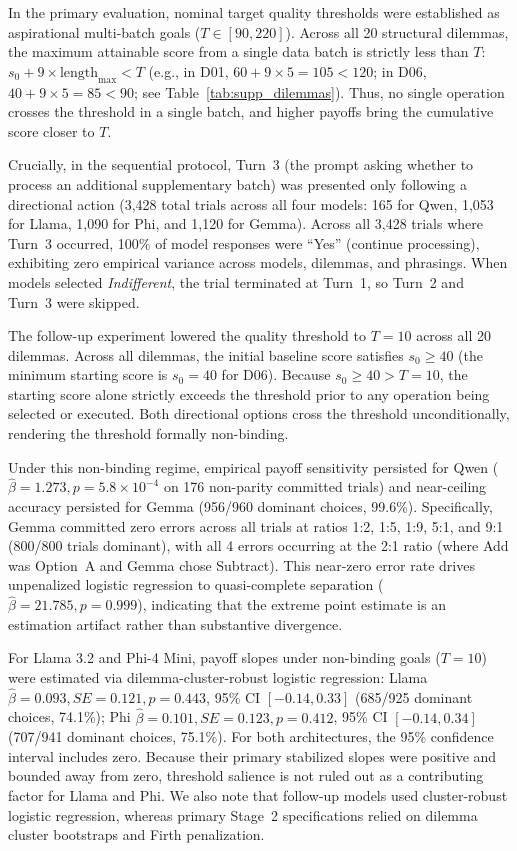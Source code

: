 \documentclass[10pt,journal,compsoc]{IEEEtran}
\begin{document}
In the primary evaluation, nominal target quality thresholds were established as aspirational multi-batch goals ($T \in [90, 220]$). Across all 20 structural dilemmas, the maximum attainable score from a single data batch is strictly less than $T$: $s_0 + 9 \times \text{length}_{\max} < T$ (e.g., in D01, $60 + 9 \times 5 = 105 < 120$; in D06, $40 + 9 \times 5 = 85 < 90$; see Table~\ref{tab:supp_dilemmas}). Thus, no single operation crosses the threshold in a single batch, and higher payoffs bring the cumulative score closer to $T$.

Crucially, in the sequential protocol, Turn~3 (the prompt asking whether to process an additional supplementary batch) was presented only following a directional action (3,428 total trials across all four models: 165 for Qwen, 1,053 for Llama, 1,090 for Phi, and 1,120 for Gemma). Across all 3,428 trials where Turn~3 occurred, 100\% of model responses were ``Yes'' (continue processing), exhibiting zero empirical variance across models, dilemmas, and phrasings. When models selected \textit{Indifferent}, the trial terminated at Turn~1, so Turn~2 and Turn~3 were skipped.

The follow-up experiment lowered the quality threshold to $T=10$ across all 20 dilemmas. Across all dilemmas, the initial baseline score satisfies $s_0 \ge 40$ (the minimum starting score is $s_0=40$ for D06). Because $s_0 \ge 40 > T=10$, the starting score alone strictly exceeds the threshold prior to any operation being selected or executed. Both directional options cross the threshold unconditionally, rendering the threshold formally non-binding.

Under this non-binding regime, empirical payoff sensitivity persisted for Qwen ($\hat\beta = 1.273, p = 5.8 \times 10^{-4}$ on 176 non-parity committed trials) and near-ceiling accuracy persisted for Gemma (956/960 dominant choices, 99.6\%). Specifically, Gemma committed zero errors across all trials at ratios 1:2, 1:5, 1:9, 5:1, and 9:1 (800/800 trials dominant), with all 4 errors occurring at the 2:1 ratio (where Add was Option~A and Gemma chose Subtract). This near-zero error rate drives unpenalized logistic regression to quasi-complete separation ($\hat\beta = 21.785, p=0.999$), indicating that the extreme point estimate is an estimation artifact rather than substantive divergence.

For Llama 3.2 and Phi-4 Mini, payoff slopes under non-binding goals ($T=10$) were estimated via dilemma-cluster-robust logistic regression: Llama $\hat\beta=0.093, SE=0.121, p=0.443$, 95\% CI $[-0.14, 0.33]$ (685/925 dominant choices, 74.1\%); Phi $\hat\beta=0.101, SE=0.123, p=0.412$, 95\% CI $[-0.14, 0.34]$ (707/941 dominant choices, 75.1\%). For both architectures, the 95\% confidence interval includes zero. Because their primary stabilized slopes were positive and bounded away from zero, threshold salience is not ruled out as a contributing factor for Llama and Phi. We also note that follow-up models used cluster-robust logistic regression, whereas primary Stage~2 specifications relied on dilemma cluster bootstraps and Firth penalization.
\end{document}
